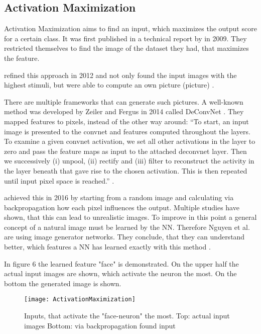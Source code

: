 \subsection{Activation Maximization}
Activation Maximization aims to find an input, which maximizes the output score for a certain class. It was first published in a technical report by  in 2009. They restricted themselves to find the image of the dataset they had, that maximizes the feature.
\par
{} refined this approach in 2012 and not only found the input images with the highest stimuli, but were able to compute an own picture (picture) \cite{Le.2012}.
\par
There are multiple frameworks that can generate such pictures. A well-known method was developed by Zeiler and Fergus in 2014 called DeConvNet \cite{Zeiler.2014}. They mapped features to pixels, instead of the other way around:
“To start, an input image is presented to the convnet and features computed throughout the layers. To examine a given convnet activation, we set all other activations in the layer to zero and pass the feature maps as input to the attached deconvnet layer. Then we successively (i) unpool, (ii) rectify and (iii) filter to reconstruct the activity in the layer beneath that gave rise to the chosen activation. This is then repeated until input pixel space is reached.” \cite[p.820]{Zeiler.2014}.
\par
{} achieved this in 2016 by starting from a random image and calculating via backpropagation how each pixel influences the output. Multiple studies have shown, that this can lead to unrealistic images. To improve in this point a general concept of a natural image must be learned by the NN. Therefore Nguyen et al. are using image generator networks. They conclude, that they can understand better, which features a NN has learned exactly with this method \cite{Nguyen.2016}. 
\par
In figure 6 the learned feature "face" is demonstrated. On the upper half the actual input images are shown, which activate the neuron the most. On the bottom the generated image is shown.
\begin{figure*}
    \center
    \texttt{[image: ActivationMaximization]}
    \caption{Inputs, that activate the "face-neuron" the most.
    Top: actual input images 
    Bottom: via backpropagation found input}
\end{figure*}